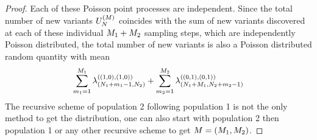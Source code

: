 \begin{proof}
    Each of these Poisson point processes are independent. Since the total number of new variants $\genericnews$ coincides with the sum of new variants discovered at each of these individual $M_{1}+M_{2}$ sampling steps, which are independently Poisson distributed, the total number of new variants is also a Poisson distributed random quantity with mean  
    \begin{align*}
        \sum_{m_{1}=1}^{M_{1}}\lambda_{(N_{1}+m_{1}-1,N_{2})}^{((1,0),(1,0))}+\sum_{m_{2}=1}^{M_{2}} \lambda_{(N_{1}+M_{1},N_{2}+m_{2}-1)}^{((0,1),(0,1))}
    \end{align*}
    The recursive scheme of population 2 following population 1 is not the only method to get the distribution, one can also start with population 2 then population 1 or any other recursive scheme to get $\vecfuturesamplesize=(\futuresamplesize{1}, \futuresamplesize{2})$.
\end{proof}


